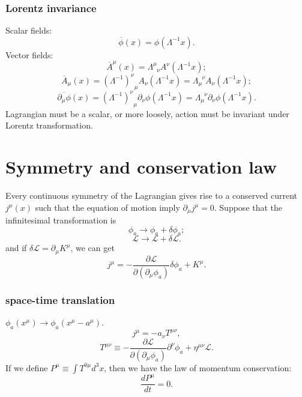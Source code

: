 \subsubsection{Lorentz invariance}

Scalar fields:
\[\overline{\phi}(x) = \phi(\Lambda^{-1} x).\]
Vector fields:
\[\overline{A}^{\mu}(x) = \Lambda^{\mu}_{\phantom{\mu}\nu} A^{\nu}(\Lambda^{-1}x);\]
\[\overline{A}_{\mu}(x) = (\Lambda^{-1})^{\nu}_{\phantom{\mu}\mu} A_{\nu}(\Lambda^{-1}x) = \Lambda_{\mu}^{\phantom{\mu}\nu}A_{\nu}(\Lambda^{-1}x);\]
\[\overline{\partial_{\mu}\phi}(x) = (\Lambda^{-1})^{\nu}_{\phantom{\mu}\mu} \partial_{\nu} \phi (\Lambda^{-1}x) = \Lambda_{\mu}^{\phantom{\mu}\nu} \partial_{\nu} \phi (\Lambda^{-1}x).\]
Lagrangian must be a scalar, or more loosely, action must be invariant under Lorentz transformation.

\section{Symmetry and conservation law}
\begin{newthem}
	Every continuous symmetry of the Lagrangian gives rise to a conserved current $j^{\mu}(x)$ such that the equation of motion imply $\partial_{\mu} j^{\mu} = 0$.
	Suppose that the infinitesimal transformation is
	\[\phi_a \rightarrow \phi_a + \delta \phi_a;\]
	\[\mathcal{L} \rightarrow  \mathcal{L} + \delta \mathcal{L} .\]
	and if $\delta \mathcal{L} = \partial_{\mu} K^{\mu}$, we can get
	\[j^{\mu} = -\frac{\partial \mathcal{L}}{\partial (\partial_{\mu} \phi_a)} \delta \phi_a + K^{\mu}.\]
\end{newthem}

\subsubsection{space-time translation}
$\phi_{a}(x^{\mu}) \to \phi_{a}(x^{\mu}-a^{\mu})$.
\[j^{\mu} = -a_{\nu} T^{\mu \nu},\]
\[T^{\mu \nu} \equiv -\frac{\partial \mathcal{L}}{\partial(\partial_{\mu}\phi_a)} \partial^{\nu} \phi_a + \eta^{\mu \nu} \mathcal{L}.\]
If we define $P^{\mu} \equiv \int T^{0 \mu} d^3 x$, then we have the law of momentum conservation:
\[\frac{d P^{\mu}}{dt} = 0.\]

